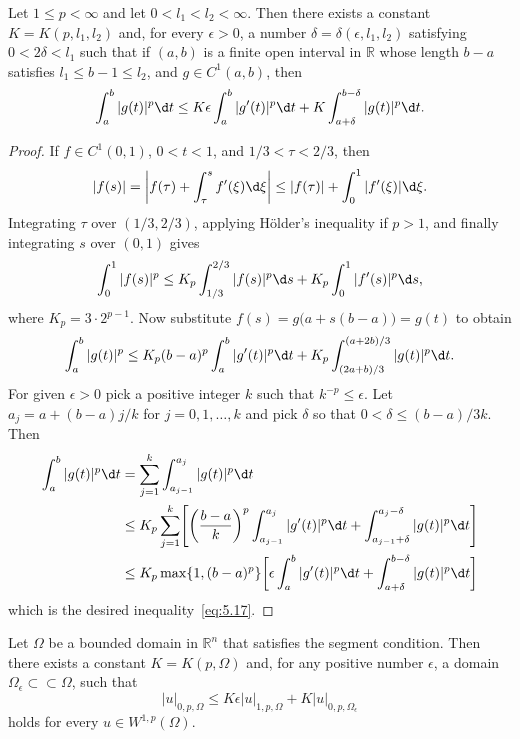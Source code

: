 \begin{lemma}
  Let $1\leq p<\infty$ and let $0<l_1<l_2<\infty$. Then there exists a constant
  $K = K(p,l_1,l_2)$ and, for every $\epsilon>0$, a number $\delta = \delta(\epsilon,l_1,l_2)$
  satisfying $0<2\delta<l_1$ such that if $(a,b)$ is a finite open interval
  in $\mathbb{R}$ whose length $b-a$ satisfies $l_1\leq b-1\leq l_2$, and
  $g\in C^1(a,b)$, then
  \begin{equation}\label{eq:5.17}
    \int_a^b |g(t)|^p \d t \leq K\epsilon \int_a^b |g'(t)|^p \d t
      + K \int_{a+\delta}^{b-\delta} |g(t)|^p \d t.
  \end{equation}
\end{lemma}

\begin{proof}
  If $f\in C^1(0,1)$, $0<t<1$, and $1/3<\tau<2/3$, then
  \[ |f(s)| = \biggl|f(\tau) + \int_{\tau}^s f'(\xi) \d\xi\biggr|
      \leq |f(\tau)| + \int_0^1 |f'(\xi)| \d\xi. \]
  Integrating $\tau$ over $(1/3,2/3)$, applying H\"older's inequality
  if $p>1$, and finally integrating $s$ over $(0,1)$ gives
  \[ \int_0^1 |f(s)|^p \leq K_p \int_{1/3}^{2/3} |f(s)|^p \d s
      + K_p \int_0^1 |f'(s)|^p \d s, \]
  where $K_p = 3\cdot 2^{p-1}$. Now substitute $f(s) = g\bigl(a+s(b-a)\bigr)=g(t)$
  to obtain
  \[ \int_a^b |g(t)|^p \leq K_p (b-a)^p \int_a^b |g'(t)|^p \d t
      + K_p \int_{(2a+b)/3}^{(a+2b)/3} |g(t)|^p \d t. \]
  For given $\epsilon>0$ pick a positive integer $k$ such that $k^{-p}\leq\epsilon$.
  Let $a_j = a+(b-a)j/k$ for $j=0,1,\ldots,k$ and pick $\delta$ so that
  $0<\delta\leq (b-a)/3k$. Then
  \begin{align*}
    \int_a^b |g(t)|^p \d t
    & = \sum_{j=1}^k \int_{a_{j-1}}^{a_j} |g(t)|^p \d t \\
    & \leq K_p \sum_{j=1}^k \Biggl[\biggl(\frac{b-a}{k}\biggr)^p \int_{a_{j-1}}^{a_j}
        |g'(t)|^p \d t + \int_{a_{j-1}+\delta}^{a_j-\delta} |g(t)|^p \d t\Biggr] \\
    & \leq K_p \max\{1,(b-a)^p\} \biggl[\epsilon \int_a^b |g'(t)|^p \d t
        + \int_{a+\delta}^{b-\delta} |g(t)|^p \d t\biggr]
  \end{align*}
  which is the desired inequality~\eqref{eq:5.17}.
\end{proof}


\begin{lemma}
  Let $\Omega$ be a bounded domain in $\mathbb{R}^n$ that satisfies the segment
  condition. Then there exists a constant $K=K(p,\Omega)$ and, for any positive
  number $\epsilon$, a domain $\Omega_{\epsilon}\subset\subset\Omega$, such that
  \begin{equation}\label{eq:5.18}
    |u|_{0,p,\Omega} \leq K\epsilon |u|_{1,p,\Omega} + K |u|_{0,p,\Omega_{\epsilon}}
  \end{equation}
  holds for every $u\in W^{1,p}(\Omega)$.
\end{lemma}

